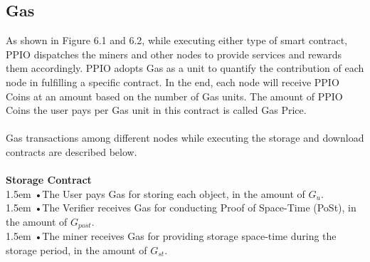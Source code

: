 \documentclass[10pt,a4paper]{article}
\begin{document}
      \subsection{Gas}  %
As shown in Figure 6.1 and 6.2, while executing either type of smart contract, PPIO dispatches the miners and other nodes to provide services and rewards them accordingly. PPIO adopts Gas as a unit to quantify the contribution of each node in fulfilling a specific contract. In the end, each node will receive PPIO Coins at an amount based on the number of Gas units. The amount of PPIO Coins the user pays per Gas unit in this contract is called Gas Price.
 \vspace{-0.6em}
\\ \\Gas transactions among different nodes while executing the storage and download contracts are described below.
 \vspace{-0.5em}
\\\\{\bf Storage Contract} 
 \vspace{-0.8em}
\\

\hangindent 1.5em
\noindent   
•\quad The User pays Gas for storing each object, in the amount of $G_{u}$.
 \vspace{-0.6em}
\\

\hangindent 1.5em
\noindent   
•\quad The Verifier receives Gas for conducting Proof of Space-Time (PoSt), in the amount of $G_{post}$.
 \vspace{-0.6em}
\\

\hangindent 1.5em
\noindent   
•\quad The miner receives Gas for providing storage space-time during the storage period, in the amount of $G_{st}$.
 \vspace{-0.5em}
\\
\end{document}
